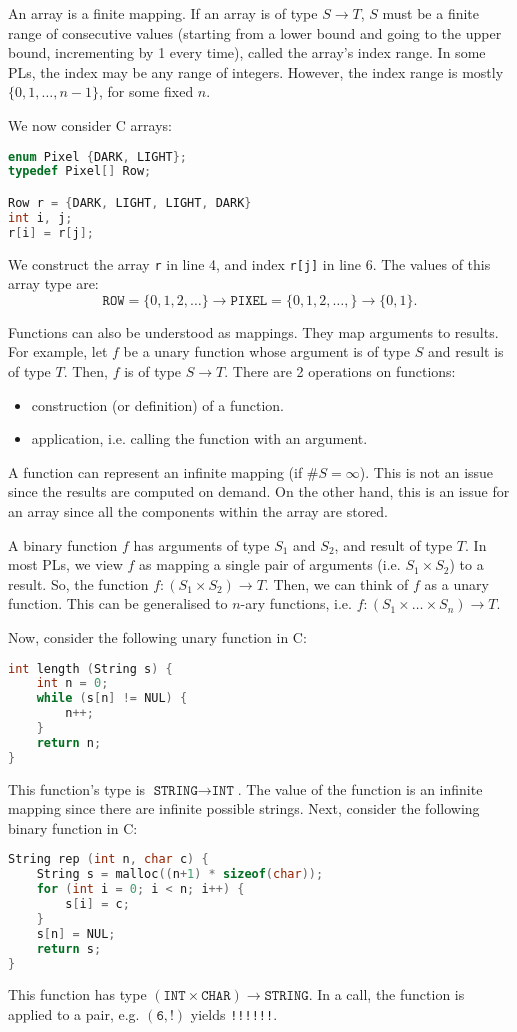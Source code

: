 \documentclass[a4paper, openany]{memoir}
\begin{document}
An array is a finite mapping. If an array is of type $S \to T$, $S$ must be a finite range of consecutive values (starting from a lower bound and going to the upper bound, incrementing by 1 every time), called the array's index range. In some PLs, the index may be any range of integers. However, the index range is mostly $\{0, 1, \dots, n-1\}$, for some fixed $n$.

We now consider C arrays:
\begin{lstlisting}[language=C]
enum Pixel {DARK, LIGHT};
typedef Pixel[] Row;

Row r = {DARK, LIGHT, LIGHT, DARK}
int i, j;
r[i] = r[j];
\end{lstlisting}
We construct the array \texttt{r} in line 4, and index \texttt{r[j]} in line 6.
The values of this array type are: 
\[\texttt{ROW} = \{0, 1, 2, \dots\} \to \texttt{PIXEL} = \{0, 1, 2, \dots, \} \to \{0, 1\}.\]

Functions can also be understood as mappings. They map arguments to results. For example, let $f$ be a unary function whose argument is of type $S$ and result is of type $T$. Then, $f$ is of type $S \to T$. There are 2 operations on functions:
\begin{itemize}
    \item construction (or definition) of a function.
    \item application, i.e. calling the function with an argument.
\end{itemize}
A function can represent an infinite mapping (if $\# S = \infty$). This is not an issue since the results are computed on demand. On the other hand, this is an issue for an array since all the components within the array are stored.

A binary function $f$ has arguments of type $S_1$ and $S_2$, and result of type $T$. In most PLs, we view $f$ as mapping a single pair of arguments (i.e. $S_1 \times S_2$) to a result. So, the function $f: (S_1 \times S_2) \to T$. Then, we can think of $f$ as a unary function. This can be generalised to $n$-ary functions, i.e. $f: (S_1 \times \dots \times S_n) \to T$.

Now, consider the following unary function in C:
\begin{lstlisting}[language=C]
int length (String s) {
    int n = 0;
    while (s[n] != NUL) {
        n++;
    }
    return n;
}
\end{lstlisting}
This function's type is $\texttt{STRING} \to \texttt{INT}$. The value of the function is an infinite mapping since there are infinite possible strings. Next, consider the following binary function in C:
\begin{lstlisting}[language=C]
String rep (int n, char c) {
    String s = malloc((n+1) * sizeof(char));
    for (int i = 0; i < n; i++) {
        s[i] = c;
    }
    s[n] = NUL;
    return s;
}
\end{lstlisting}
This function has type $(\texttt{INT} \times \texttt{CHAR}) \to \texttt{STRING}$. In a call, the function is applied to a pair, e.g. $(\texttt{6}, \texttt{!})$ yields \texttt{!!!!!!}.
\end{document}
